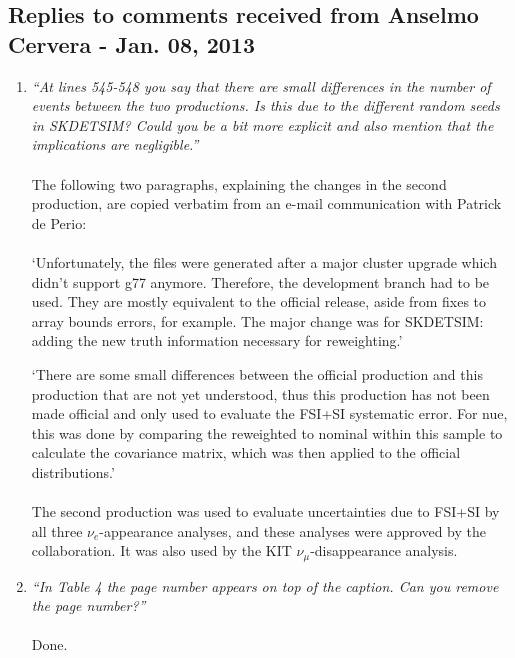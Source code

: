 \subsection{
  Replies to comments received from Anselmo Cervera - Jan. 08, 2013 }

\begin{enumerate}

\vspace{5 mm}
\item
{\em
  ``At lines 545-548 you say that there are small differences in the number of events between the two productions. 
    Is this due to the different random seeds in SKDETSIM? 
    Could you be a bit more explicit and also mention that the implications are negligible.''
}\\
\\
The following two paragraphs,
explaining the changes in the second production,
 are copied verbatim from an e-mail communication with Patrick de Perio:\\
\\
`Unfortunately, the files were generated after a major cluster upgrade
which didn't support g77 anymore. Therefore, the development branch had
to be used. They are mostly equivalent to the official release, aside
from fixes to array bounds errors, for example. The major change was for
SKDETSIM: adding the new truth information necessary for reweighting.'

`There are some small differences between the official production and
this production that are not yet understood, thus this production has
not been made official and only used to evaluate the FSI+SI systematic
error. For nue, this was done by comparing the reweighted to nominal
within this sample to calculate the covariance matrix, which was then
applied to the official distributions.'\\
\\
The second production was used to evaluate uncertainties due to FSI+SI by all three 
$\nu_{e}$-appearance analyses, and these analyses were approved by the collaboration. 
It was also used by the KIT $\nu_{\mu}$-disappearance analysis. 

\vspace{5 mm}
\item
{\em
  ``In Table 4 the page number appears on top of the caption. Can you remove the page number?''
}\\
\\
Done.


\end{enumerate}
